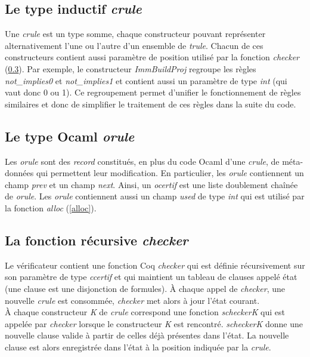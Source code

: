 \documentclass[11pt]{article}
\begin{document}
\subsection{Le type inductif \textit{crule}}\label{regroupement}

Une \textit{crule} est un type somme, chaque constructeur pouvant représenter alternativement l'une ou l'autre d'un ensemble de \textit{trule}. Chacun de ces constructeurs contient aussi paramètre de position utilisé par la fonction \textit{checker} (\ref{checker}). Par exemple, le constructeur \textit{ImmBuildProj} regroupe les règles \textit{not\_implies0} et \textit{not\_implies1} et contient aussi un paramètre de type \textit{int} (qui vaut donc 0 ou 1). Ce regroupement permet d'unifier le fonctionnement de règles similaires et donc de simplifier le traitement de ces règles dans la suite du code.

\subsection{Le type Ocaml \textit{orule}}

 Les \textit{orule} sont des \textit{record} constitués, en plus du code Ocaml d'une \textit{crule}, de méta-données qui permettent leur modification. En particulier, les \textit{orule} contiennent un champ \textit{prev} et un champ \textit{next}. Ainsi, un \textit{ocertif} est une liste doublement chaînée de \textit{orule}. Les \textit{orule} contiennent aussi un champ \textit{used} de type \textit{int} qui est utilisé par la fonction \textit{alloc} (\ref{alloc}).

\subsection{La fonction récursive \textit{checker}} \label{checker}

Le vérificateur contient une fonction Coq \textit{checker} qui est définie récursivement sur son paramètre de type \textit{ccertif} et qui maintient un tableau de clauses appelé état (une clause est une disjonction de formules). À chaque appel de \textit{checker}, une nouvelle \textit{crule} est consommée, \textit{checker} met alors à jour l'état courant.\\

À chaque constructeur \textit{K} de \textit{crule} correspond une fonction \textit{scheckerK} qui est appelée par \textit{checker} lorsque le constructeur \textit{K} est rencontré. \textit{scheckerK} donne une nouvelle clause valide à partir de celles déjà présentes dans l'état. La nouvelle clause est alors enregistrée dans l'état à la position indiquée par la \textit{crule}.\\
\end{document}
